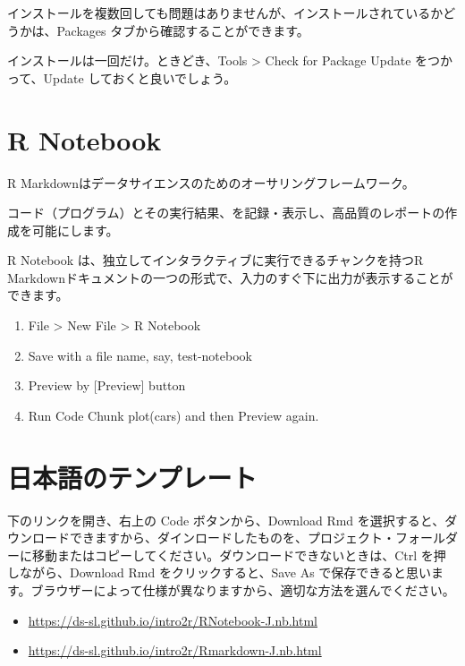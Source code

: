 \documentclass[
  xelatex, ja=standard]{bxjsbook}
\providecommand{\tightlist}{%
  \setlength{\itemsep}{0pt}\setlength{\parskip}{0pt}}
\theoremstyle{definition}
\theoremstyle{definition}
\theoremstyle{definition}
\theoremstyle{definition}
\theoremstyle{remark}
\begin{document}
インストールを複数回しても問題はありませんが、インストールされているかどうかは、Packages タブから確認することができます。

インストールは一回だけ。ときどき、Tools \textgreater{} Check for Package Update をつかって、Update しておくと良いでしょう。

\hypertarget{r-notebook}{%
\section{R Notebook}\label{r-notebook}}

R Markdownはデータサイエンスのためのオーサリングフレームワーク。

コード（プログラム）とその実行結果、を記録・表示し、高品質のレポートの作成を可能にします。

R Notebook は、独立してインタラクティブに実行できるチャンクを持つR Markdownドキュメントの一つの形式で、入力のすぐ下に出力が表示することができます。

\begin{enumerate}
\def\labelenumi{\arabic{enumi}.}
\tightlist
\item
  File \textgreater{} New File \textgreater{} R Notebook
\item
  Save with a file name, say, test-notebook
\item
  Preview by {[}Preview{]} button
\item
  Run Code Chunk plot(cars) and then Preview again.
\end{enumerate}

\hypertarget{ux65e5ux672cux8a9eux306eux30c6ux30f3ux30d7ux30ecux30fcux30c8}{%
\section{日本語のテンプレート}\label{ux65e5ux672cux8a9eux306eux30c6ux30f3ux30d7ux30ecux30fcux30c8}}

下のリンクを開き、右上の Code ボタンから、Download Rmd を選択すると、ダウンロードできますから、ダインロードしたものを、プロジェクト・フォールダーに移動またはコピーしてください。ダウンロードできないときは、Ctrl を押しながら、Download Rmd をクリックすると、Save As で保存できると思います。ブラウザーによって仕様が異なりますから、適切な方法を選んでください。

\begin{itemize}
\tightlist
\item
  \url{https://ds-sl.github.io/intro2r/RNotebook-J.nb.html}
\item
  \url{https://ds-sl.github.io/intro2r/Rmarkdown-J.nb.html}
\end{itemize}
\end{document}

